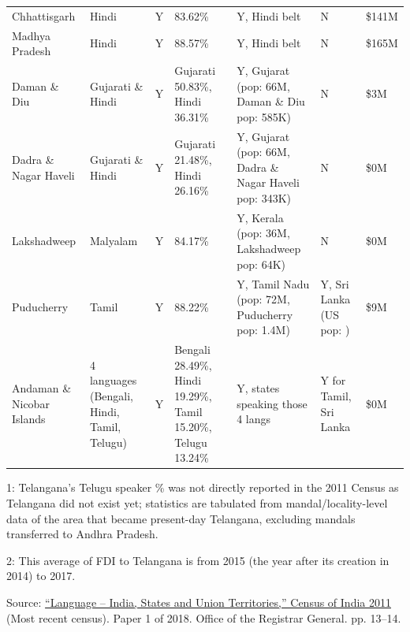 \documentclass[12pt]{article}
\begin{document}
\begin{table}[htbp]
\begin{threeparttable}
\begin{tabularx}{\textwidth}{@{}Y Y Z Z Y Y Y@{}}
Chhattisgarh & Hindi & Y & 83.62\% & Y, Hindi belt & N & \$141M \\
Madhya Pradesh & Hindi & Y & 88.57\% & Y, Hindi belt & N & \$165M \\
Daman \& Diu & Gujarati \& Hindi & Y & Gujarati 50.83\%, Hindi 36.31\% & Y, Gujarat (pop: 66M, Daman \& Diu pop: 585K) & N & \$3M \\
Dadra \& Nagar Haveli & Gujarati \& Hindi & Y & Gujarati 21.48\%, Hindi 26.16\% & Y, Gujarat (pop: 66M, Dadra \& Nagar Haveli pop: 343K) & N & \$0M \\
Lakshadweep & Malyalam & Y & 84.17\% & Y, Kerala  (pop: 36M, Lakshadweep pop: 64K) & N & \$0M \\
Puducherry & Tamil & Y & 88.22\% & Y, Tamil Nadu  (pop: 72M, Puducherry pop: 1.4M) & Y, Sri Lanka (US pop: ) & \$9M \\
Andaman \& Nicobar Islands & 4 languages (Bengali, Hindi, Tamil, Telugu)  & Y & Bengali 28.49\%, Hindi 19.29\%, Tamil 15.20\%, Telugu 13.24\% & Y, states speaking those 4 langs & Y for Tamil, Sri Lanka & \$0M \\
\bottomrule
\end{tabularx}

\begin{tablenotes}[flushleft]
\footnotesize
\item 1: Telangana's Telugu speaker \% was not directly reported in the 2011 Census as Telangana did not exist yet; statistics are tabulated from mandal/locality-level data of the area that became present-day Telangana, excluding mandals transferred to Andhra Pradesh.
\item 2: This average of FDI to Telangana is from 2015 (the year after its creation in 2014) to 2017.
\item[Source:] \href{https://www.censusindia.gov.in/nada/index.php/catalog/42458}{``Language -- India, States and Union Territories,'' Census of India 2011} (Most recent census). Paper 1 of 2018. Office of the Registrar General. pp. 13–14.
\end{tablenotes}

\end{threeparttable}
\end{table}
\end{document}
